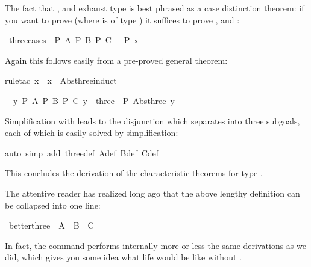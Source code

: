 \begin{isabellebody}
\begin{isamarkuptext}
The fact that ,  and  exhaust type  is
best phrased as a case distinction theorem: if you want to prove 
(where  is of type ) it suffices to prove ,
 and :%
\end{isamarkuptext}%
\isamarkuptrue%
\ three{\isacharunderscore}cases{\isacharcolon}\ {\isachardoublequote}{\isasymlbrakk}\ P\ A{\isacharsemicolon}\ P\ B{\isacharsemicolon}\ P\ C\ {\isasymrbrakk}\ {\isasymLongrightarrow}\ P\ x{\isachardoublequote}\isamarkupfalse%
%
\begin{isamarkuptxt}%
\noindent Again this follows easily from a pre-proved general theorem:%
\end{isamarkuptxt}%
\isamarkuptrue%
rule{\isacharunderscore}tac\ x\ {\isacharequal}\ x\ \ Abs{\isacharunderscore}three{\isacharunderscore}induct{\isacharparenright}\isamarkupfalse%
%
\begin{isamarkuptxt}%
\begin{isabelle}%
\ {}{\isachardot}\ {\isasymAnd}y{\isachardot}\ {\isasymlbrakk}P\ A{\isacharsemicolon}\ P\ B{\isacharsemicolon}\ P\ C{\isacharsemicolon}\ y\ {\isasymin}\ three{\isasymrbrakk}\ {\isasymLongrightarrow}\ P\ {\isacharparenleft}Abs{\isacharunderscore}three\ y{\isacharparenright}%
\end{isabelle}
Simplification with  leads to the disjunction  which  separates into three
subgoals, each of which is easily solved by simplification:%
\end{isamarkuptxt}%
\isamarkuptrue%
auto\ simp\ add{\isacharcolon}\ three{\isacharunderscore}def\ A{\isacharunderscore}def\ B{\isacharunderscore}def\ C{\isacharunderscore}def{\isacharparenright}\isanewline
\isamarkupfalse%
\isamarkupfalse%
%
\begin{isamarkuptext}%
\noindent
This concludes the derivation of the characteristic theorems for
type .

The attentive reader has realized long ago that the
above lengthy definition can be collapsed into one line:%
\end{isamarkuptext}%
\isamarkuptrue%
\ better{\isacharunderscore}three\ {\isacharequal}\ A\ {\isacharbar}\ B\ {\isacharbar}\ C\isamarkupfalse%
%
\begin{isamarkuptext}%
\noindent
In fact, the  command performs internally more or less
the same derivations as we did, which gives you some idea what life would be
like without .


\end{isamarkuptext}
\end{isabellebody}
